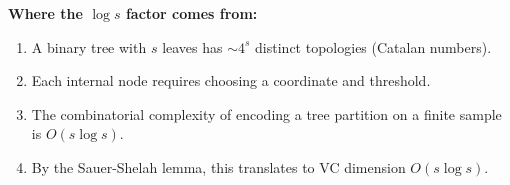 \textbf{Where the $\log s$ factor comes from:}
\begin{enumerate}
\item A binary tree with $s$ leaves has $\sim 4^s$ distinct topologies (Catalan numbers).
\item Each internal node requires choosing a coordinate and threshold.
\item The combinatorial complexity of encoding a tree partition on a finite sample is $O(s \log s)$.
\item By the Sauer-Shelah lemma, this translates to VC dimension $O(s \log s)$.
\end{enumerate}
